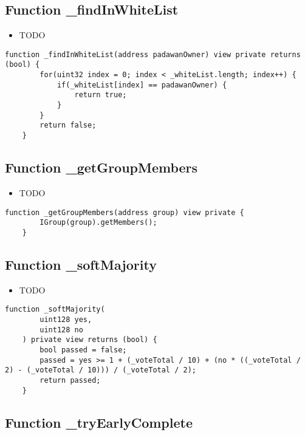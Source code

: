 \subsection{Function \_{}findInWhiteList}

\begin{itemize}
\item TODO
\end{itemize}

\begin{lstlisting}[firstnumber=224]
    function _findInWhiteList(address padawanOwner) view private returns (bool) {
        for(uint32 index = 0; index < _whiteList.length; index++) {
            if(_whiteList[index] == padawanOwner) {
                return true;
            }
        }
        return false;
    }
\end{lstlisting}

\subsection{Function \_{}getGroupMembers}

\begin{itemize}
\item TODO
\end{itemize}

\begin{lstlisting}[firstnumber=233]
    function _getGroupMembers(address group) view private {
        IGroup(group).getMembers();
    }
\end{lstlisting}

\subsection{Function \_{}softMajority}

\begin{itemize}
\item TODO
\end{itemize}

\begin{lstlisting}[firstnumber=170]
    function _softMajority(
        uint128 yes,
        uint128 no
    ) private view returns (bool) {
        bool passed = false;
        passed = yes >= 1 + (_voteTotal / 10) + (no * ((_voteTotal / 2) - (_voteTotal / 10))) / (_voteTotal / 2);
        return passed;
    }
\end{lstlisting}

\subsection{Function \_{}tryEarlyComplete}

